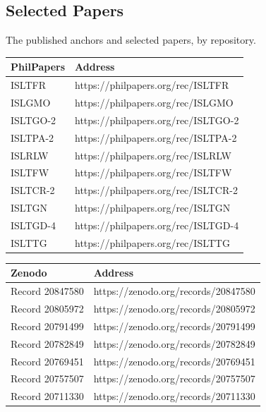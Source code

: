 \documentclass[10pt,twocolumn]{article}
\begin{document}
\hypertarget{selected-papers}{%
\subsection{Selected Papers}\label{selected-papers}}

The published anchors and selected papers, by repository.

\begin{center}\small
\begin{tabular}{>{\raggedright\arraybackslash}p{}>{\raggedright\arraybackslash}p{}}
\toprule
\textbf{PhilPapers} & \textbf{Address} \\
\midrule
ISLTFR & https://philpapers.org/rec/ISLTFR \\
ISLGMO & https://philpapers.org/rec/ISLGMO \\
ISLTGO-2 & https://philpapers.org/rec/ISLTGO-2 \\
ISLTPA-2 & https://philpapers.org/rec/ISLTPA-2 \\
ISLRLW & https://philpapers.org/rec/ISLRLW \\
ISLTFW & https://philpapers.org/rec/ISLTFW \\
ISLTCR-2 & https://philpapers.org/rec/ISLTCR-2 \\
ISLTGN & https://philpapers.org/rec/ISLTGN \\
ISLTGD-4 & https://philpapers.org/rec/ISLTGD-4 \\
ISLTTG & https://philpapers.org/rec/ISLTTG \\
\bottomrule
\end{tabular}
\end{center}

\begin{center}\small
\begin{tabular}{>{\raggedright\arraybackslash}p{}>{\raggedright\arraybackslash}p{}}
\toprule
\textbf{Zenodo} & \textbf{Address} \\
\midrule
Record 20847580 & https://zenodo.org/records/20847580 \\
Record 20805972 & https://zenodo.org/records/20805972 \\
Record 20791499 & https://zenodo.org/records/20791499 \\
Record 20782849 & https://zenodo.org/records/20782849 \\
Record 20769451 & https://zenodo.org/records/20769451 \\
Record 20757507 & https://zenodo.org/records/20757507 \\
Record 20711330 & https://zenodo.org/records/20711330 \\
\bottomrule
\end{tabular}
\end{center}
\end{document}
